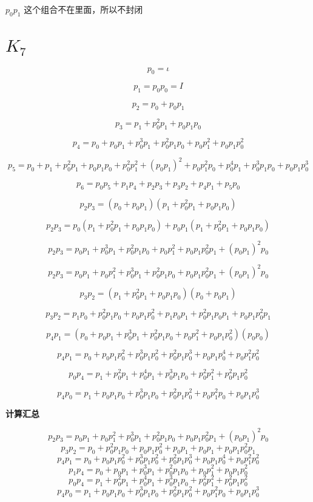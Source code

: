 \documentclass[a4paper,12pt]{article}
\numberwithin{definition}{section}
\numberwithin{lemma}{section}
\numberwithin{proposition}{section}
\numberwithin{theorem}{section}
\numberwithin{grammar}{section}
\numberwithin{program}{section}
\numberwithin{convention}{section}
\numberwithin{corollary}{section}
\numberwithin{principle}{section}
\begin{document}
$p_0 p_1$ 这个组合不在里面，所以不封闭

\section{$K_7$}

$$p_0 = {\iota} $$

$$p_1 = p_0 p_0 = {I}$$

$$p_2 = p_0 + p_0 p_1$$

$$p_3 = p_1 + p_0^2 p_1 + p_0 p_1 p_0$$

$$p_4 = p_0 + p_0 p_1 + p_0^3 p_1 + p_0^2 p_1 p_0 + p_0 p_1^2 + p_0 p_1 p_0^2$$

$$p_5 = p_0 + p_1 + p_0^2 p_1 + p_0 p_1 p_0 + p_0^2 p_1^2 + (p_0 p_1)^2 + p_0 p_1^2 p_0 + p_0^4 p_1 + p_0^3 p_1 p_0 + p_0 p_1 p_0^3$$

$$p_6 = p_0 p_5 + p_1 p_4 + p_2 p_3 + p_3 p_2 + p_4 p_1 + p_5 p_0$$

$$p_2 p_3 = (p_0 + p_0 p_1) (p_1 + p_0^2 p_1 + p_0 p_1 p_0)$$

$$p_2 p_3 = p_0 (p_1 + p_0^2 p_1 + p_0 p_1 p_0) + p_0 p_1 (p_1 + p_0^2 p_1 + p_0 p_1 p_0)$$

$$p_2 p_3 =  p_0 p_1 + p_0^3 p_1 + p_0^2 p_1 p_0 + p_0 p_1^2 + p_0 p_1 p_0^2 p_1 + (p_0 p_1)^2 p_0$$

$$p_2 p_3 =  p_0 p_1 + p_0 p_1^2 + p_0^3 p_1 + p_0^2 p_1 p_0 + p_0 p_1 p_0^2 p_1 + (p_0 p_1)^2 p_0$$

$$p_3 p_2 = (p_1 + p_0^2 p_1 + p_0 p_1 p_0) (p_0 + p_0 p_1)$$

$$p_3 p_2 = p_1 p_0 + p_0^2 p_1 p_0 + p_0 p_1 p_0^2 + p_1 p_0 p_1 + p_0^2 p_1 p_0 p_1 + p_0 p_1 p_0^2 p_1 $$

$$p_4 p_1 = (p_0 + p_0 p_1 + p_0^3 p_1 + p_0^2 p_1 p_0 + p_0 p_1^2 + p_0 p_1 p_0^2) (p_0 p_0)$$

$$p_4 p_1 = p_0 + p_0 p_1 p_0^2 + p_0^3 p_1 p_0^2 + p_0^2 p_1 p_0^3 + p_0 p_1 p_0^4 + p_0 p_1^2 p_0^2$$

$$p_0 p_4 = p_1 + p_0^2 p_1 + p_0^4 p_1 + p_0^3 p_1 p_0 + p_0^2 p_1^2 + p_0^2 p_1 p_0^2 $$

$$p_4 p_0 = p_1 + p_0 p_1 p_0 + p_0^3 p_1 p_0 + p_0^2 p_1 p_0^2 + p_0 p_1^2 p_0 + p_0 p_1 p_0^3$$

\textbf{计算汇总}

$$p_2 p_3 = p_0 p_1 + p_0 p_1^2 + p_0^3 p_1 + p_0^2 p_1 p_0 + p_0 p_1 p_0^2 p_1 + (p_0 p_1)^2 p_0$$
$$p_3 p_2 = p_0 + p_0^2 p_1 p_0 + p_0 p_1 p_0^2 + p_0 p_1 + p_0 p_1 + p_0 p_1 p_0^2 p_1 $$
$$p_4 p_1 = p_0 + p_0 p_1 p_0^2 + p_0^3 p_1 p_0^2 + p_0^2 p_1 p_0^3 + p_0 p_1 p_0^4 + p_0 p_1^2 p_0^2$$
$$p_1 p_4 = p_0 + p_0 p_1 + p_0^3 p_1 + p_0^2 p_1 p_0 + p_0 p_1^2 + p_0 p_1 p_0^2$$
$$p_0 p_4 = p_1 + p_0^2 p_1 + p_0^4 p_1 + p_0^3 p_1 p_0 + p_0^2 p_1^2 + p_0^2 p_1 p_0^2 $$
$$p_4 p_0 = p_1 + p_0 p_1 p_0 + p_0^3 p_1 p_0 + p_0^2 p_1 p_0^2 + p_0 p_1^2 p_0 + p_0 p_1 p_0^3$$
\end{document}
